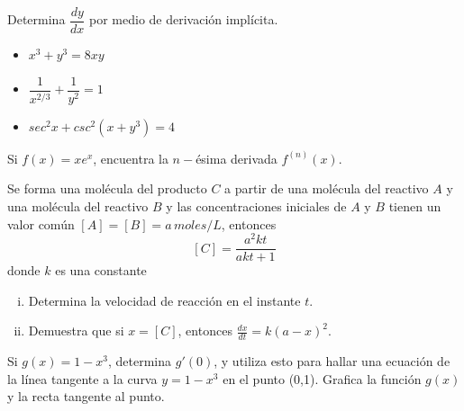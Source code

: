 \documentclass[10pt]{exam}
\begin{document}
\begin{questions}
 \vskip20pt

    \question Determina $\dfrac{dy}{dx}$ por medio de derivación implícita.
    \begin{itemize}
        \item $x^3+y^3=8xy$
        \item $\dfrac{1}{x^{2/3}}+\dfrac{1}{y^2}=1$
        \item $sec^2 x+csc^2 (x+y^3)=4$
    \end{itemize}
    
    \question Si $f(x)=xe^x$, encuentra la $n-$ésima derivada $f^{(n)}(x)$.
    
    
    \question   Se forma una molécula del producto $C$ a partir de una molécula del reactivo $A$ y una molécula del reactivo $B$ y las concentraciones iniciales de $A$ y $B$ tienen un valor común $[A]=[B]=a\,moles/L$, entonces
    $$[C]=\frac{a^2kt}{akt+1}$$
    donde $k$ es una constante
    \begin{enumerate}[i)]
        \item Determina la velocidad de reacción en el instante $t$.
        \item Demuestra que si $x=[C]$, entonces $\frac{dx}{dt}=k(a-x)^2$.
    \end{enumerate}{}
    
 \vskip 10pt
\normalsize

   \question Si $g(x)=1-x^3$, determina $g'(0)$, y utiliza esto para hallar una ecuación de la línea tangente a la curva $y=1-x^3$ en el punto (0,1). Grafica la función $g(x)$ y la recta tangente al punto.
    



\end{questions}
\end{document}
